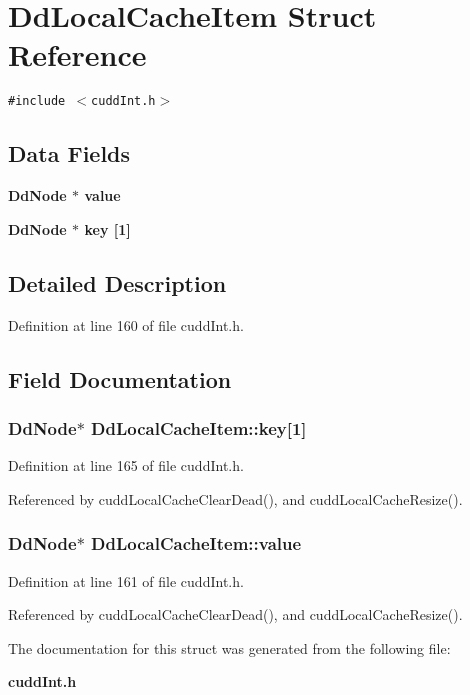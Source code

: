 \section{Dd\-Local\-Cache\-Item Struct Reference}
\label{structDdLocalCacheItem}
{\tt \#include $<$cudd\-Int.h$>$}

\subsection*{Data Fields}
\begin{CompactItemize}
\item 
\bf{Dd\-Node} $\ast$ \bf{value}
\item 
\bf{Dd\-Node} $\ast$ \bf{key} [1]
\end{CompactItemize}


\subsection{Detailed Description}




Definition at line 160 of file cudd\-Int.h.

\subsection{Field Documentation}
\subsubsection{\setlength{\rightskip}{0pt plus 5cm}\bf{Dd\-Node}$\ast$ \bf{Dd\-Local\-Cache\-Item::key}[1]}\label{structDdLocalCacheItem_292869eac20601c552cace72262ef40e}




Definition at line 165 of file cudd\-Int.h.

Referenced by cudd\-Local\-Cache\-Clear\-Dead(), and cudd\-Local\-Cache\-Resize().
\subsubsection{\setlength{\rightskip}{0pt plus 5cm}\bf{Dd\-Node}$\ast$ \bf{Dd\-Local\-Cache\-Item::value}}\label{structDdLocalCacheItem_6b2c56e824fa116168915e1391e467d1}




Definition at line 161 of file cudd\-Int.h.

Referenced by cudd\-Local\-Cache\-Clear\-Dead(), and cudd\-Local\-Cache\-Resize().

The documentation for this struct was generated from the following file:\begin{CompactItemize}
\item 
\bf{cudd\-Int.h}\end{CompactItemize}
